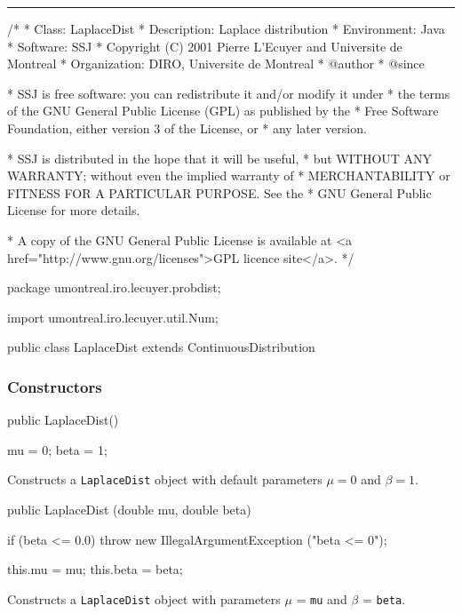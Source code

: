 \bigskip\hrule

\begin{code}
\begin{hide}
/*
 * Class:        LaplaceDist
 * Description:  Laplace distribution
 * Environment:  Java
 * Software:     SSJ 
 * Copyright (C) 2001  Pierre L'Ecuyer and Universite de Montreal
 * Organization: DIRO, Universite de Montreal
 * @author       
 * @since

 * SSJ is free software: you can redistribute it and/or modify it under
 * the terms of the GNU General Public License (GPL) as published by the
 * Free Software Foundation, either version 3 of the License, or
 * any later version.

 * SSJ is distributed in the hope that it will be useful,
 * but WITHOUT ANY WARRANTY; without even the implied warranty of
 * MERCHANTABILITY or FITNESS FOR A PARTICULAR PURPOSE.  See the
 * GNU General Public License for more details.

 * A copy of the GNU General Public License is available at
   <a href="http://www.gnu.org/licenses">GPL licence site</a>.
 */
\end{hide}
package umontreal.iro.lecuyer.probdist;\begin{hide}

import umontreal.iro.lecuyer.util.Num;\end{hide}

public class LaplaceDist extends ContinuousDistribution\begin{hide} {
   private double mu;
   private double beta;
\end{hide}
\end{code}
\subsubsection* {Constructors}

\begin{code}

   public LaplaceDist()\begin{hide} {
      mu = 0;
      beta = 1;
   }\end{hide}
\end{code}
\begin{tabb} Constructs a \texttt{LaplaceDist} object with default
 parameters $\mu = 0$  and $\beta = 1$.
\end{tabb}
\begin{code}

   public LaplaceDist (double mu, double beta)\begin{hide} {
      if (beta <= 0.0)
         throw new IllegalArgumentException ("beta <= 0");

      this.mu = mu;
      this.beta = beta;
   }\end{hide}
\end{code}
\begin{tabb} Constructs a \texttt{LaplaceDist} object with parameters
 $\mu$ = \texttt{mu} and $\beta$ = \texttt{beta}.
\end{tabb}

